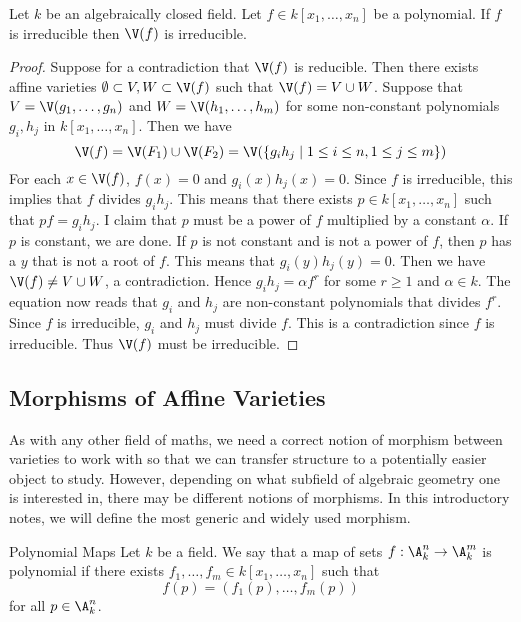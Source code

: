 \documentclass[a4paper]{article}
\begin{document}
\begin{prp}{}{} Let $k$ be an algebraically closed field. Let $f\in k[x_1,\dots,x_n]$ be a polynomial. If $f$ is irreducible then $\V(f)$ is irreducible. \tcbline
\begin{proof}
Suppose for a contradiction that $\V(f)$ is reducible. Then there exists affine varieties $\emptyset\subset V,W\subset\V(f)$ such that $\V(f)=V\cup W$. Suppose that $V=\V(g_1,\dots,g_n)$ and $W=\V(h_1,\dots,h_m)$ for some non-constant polynomials $g_i,h_j$ in $k[x_1,\dots,x_n]$. Then we have $$\V(f)=\V(F_1)\cup\V(F_2)=\V(\{g_ih_j\;|\;1\leq i\leq n, 1\leq j\leq m\})$$ For each $x\in\V(f)$, $f(x)=0$ and $g_i(x)h_j(x)=0$. Since $f$ is irreducible, this implies that $f$ divides $g_ih_j$. This means that there exists $p\in k[x_1,\dots,x_n]$ such that $pf=g_ih_j$. I claim that $p$ must be a power of $f$ multiplied by a constant $\alpha$. If $p$ is constant, we are done. If $p$ is not constant and is not a power of $f$, then $p$ has a $y$ that is not a root of $f$. This means that $g_i(y)h_j(y)=0$. Then we have $\V(f)\neq V\cup W$, a contradiction. Hence $g_ih_j=\alpha f^r$ for some $r\geq 1$ and $\alpha\in k$. The equation now reads that $g_i$ and $h_j$ are non-constant polynomials that divides $f^r$. Since $f$ is irreducible, $g_i$ and $h_j$ must divide $f$. This is a contradiction since $f$ is irreducible. Thus $\V(f)$ must be irreducible. 
\end{proof}
\end{prp}

\subsection{Morphisms of Affine Varieties}
As with any other field of maths, we need a correct notion of morphism between varieties to work with so that we can transfer structure to a potentially easier object to study. However, depending on what subfield of algebraic geometry one is interested in, there may be different notions of morphisms. In this introductory notes, we will define the most generic and widely used morphism. 

\begin{defn}{Polynomial Maps}{} Let $k$ be a field. We say that a map of sets $f:\A_k^n\to\A_k^m$ is polynomial if there exists $f_1,\dots,f_m\in k[x_1,\dots,x_n]$ such that $$f(p)=(f_1(p),\dots,f_m(p))$$ for all $p\in\A_k^n$. 
\end{defn}
\end{document}
